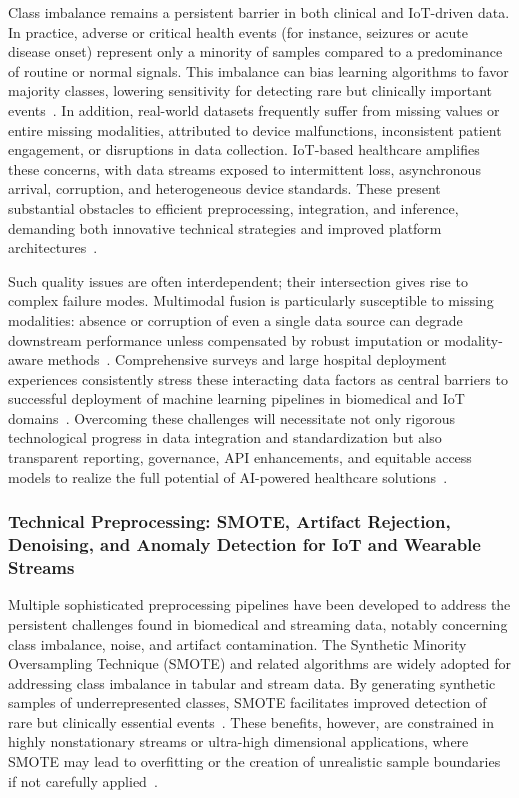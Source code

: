 \documentclass[sigconf]{acmart}
\begin{document}
Class imbalance remains a persistent barrier in both clinical and IoT-driven data. In practice, adverse or critical health events (for instance, seizures or acute disease onset) represent only a minority of samples compared to a predominance of routine or normal signals. This imbalance can bias learning algorithms to favor majority classes, lowering sensitivity for detecting rare but clinically important events~\cite{ref83,ref84}. In addition, real-world datasets frequently suffer from missing values or entire missing modalities, attributed to device malfunctions, inconsistent patient engagement, or disruptions in data collection. IoT-based healthcare amplifies these concerns, with data streams exposed to intermittent loss, asynchronous arrival, corruption, and heterogeneous device standards. These present substantial obstacles to efficient preprocessing, integration, and inference, demanding both innovative technical strategies and improved platform architectures~\cite{ref90,ref106}.

Such quality issues are often interdependent; their intersection gives rise to complex failure modes. Multimodal fusion is particularly susceptible to missing modalities: absence or corruption of even a single data source can degrade downstream performance unless compensated by robust imputation or modality-aware methods~\cite{ref78}. Comprehensive surveys and large hospital deployment experiences consistently stress these interacting data factors as central barriers to successful deployment of machine learning pipelines in biomedical and IoT domains~\cite{ref78,ref84,ref106}. Overcoming these challenges will necessitate not only rigorous technological progress in data integration and standardization but also transparent reporting, governance, API enhancements, and equitable access models to realize the full potential of AI-powered healthcare solutions~\cite{ref83,ref84}.

\subsubsection{Technical Preprocessing: SMOTE, Artifact Rejection, Denoising, and Anomaly Detection for IoT and Wearable Streams}

Multiple sophisticated preprocessing pipelines have been developed to address the persistent challenges found in biomedical and streaming data, notably concerning class imbalance, noise, and artifact contamination. The Synthetic Minority Oversampling Technique (SMOTE) and related algorithms are widely adopted for addressing class imbalance in tabular and stream data. By generating synthetic samples of underrepresented classes, SMOTE facilitates improved detection of rare but clinically essential events~\cite{ref89,ref102}. These benefits, however, are constrained in highly nonstationary streams or ultra-high dimensional applications, where SMOTE may lead to overfitting or the creation of unrealistic sample boundaries if not carefully applied~\cite{ref106}.
\end{document}
